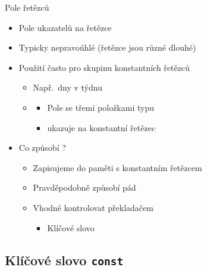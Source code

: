 \begin{frame}{Pole řetězců}

  \begin{itemize}
    \item Pole ukazatelů na řetězce

    \pause

    \item Typicky nepravoúhlé (řetězce jsou různé dlouhé)

    \pause

    \item Použití často pro skupinu konstantních řetězců
    \begin{itemize}
      \item Např.\ dny v týdnu
      \item {}
      \begin{itemize}
	\item Pole se třemi položkami typu 
	\item {} ukazuje na konstantní řetězec 
      \end{itemize}
    \end{itemize}

    \pause

    \item Co způsobí ?
    \begin{itemize}
      \item Zapisujeme do paměti s konstantním řetězcem
      \item Pravděpodobně způsobí pád
      \item Vhodné kontrolovat překladačem
      \begin{itemize}
	\item Klíčové slovo 
      \end{itemize}
    \end{itemize}

  \end{itemize}


\end{frame}

\subsection*{Klíčové slovo \texttt{const}}
\frame{\subsectionpage}


